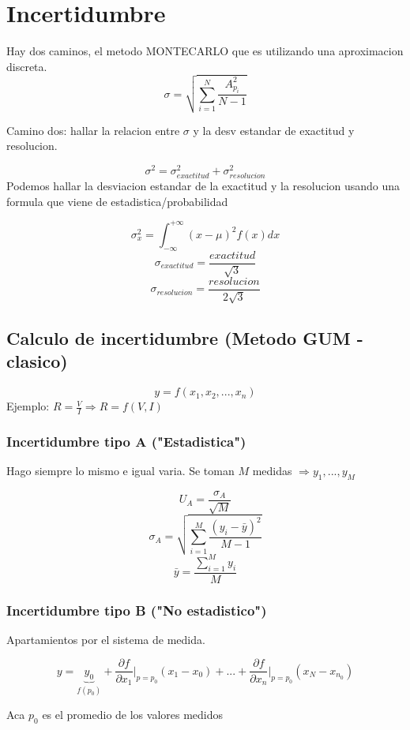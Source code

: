 \documentclass{report}
\begin{document}
\tableofcontents

\chapter{Incertidumbre}

Hay dos caminos, el metodo MONTECARLO que es utilizando una aproximacion discreta.
$$\sigma = \sqrt{\sum_{i=1}^{N} \frac{A_{p_i}^2}{N-1} }$$


Camino dos: hallar la relacion entre $\sigma$ y la desv estandar de exactitud y resolucion.

$$\sigma^2 = \sigma_{exactitud}^2 + \sigma_{resolucion}^2 $$
Podemos hallar la desviacion estandar de la exactitud y la resolucion usando una formula que viene de estadistica/probabilidad

$$\sigma_x^2 = \int_{-\infty}^{+\infty}{(x-\mu)^2f(x)dx}$$
$$\sigma_{exactitud} = \frac{exactitud}{\sqrt{3}}$$
$$\sigma_{resolucion} = \frac{resolucion}{2\sqrt{3}}$$


\section{Calculo de incertidumbre (Metodo GUM - clasico)}


$$y = f(x_1,x_2,...,x_n)$$
Ejemplo: $R = \frac{V}{I} \Rightarrow R = f(V,I)$

\subsection{Incertidumbre tipo A ("Estadistica")}

Hago siempre lo mismo e igual varia.
Se toman $M$ medidas $\Rightarrow y_1,...,y_M$

$$U_A = \frac{\sigma_A}{\sqrt{M}}$$
$$\sigma_A = \sqrt{\sum_{i=1}^M{\frac{(y_i - \bar{y})^2}{M-1}}}$$
$$\bar{y} = \frac{\sum_{i=1}^M{y_i}}{M}$$


\subsection{Incertidumbre tipo B ("No estadistico")}

Apartamientos por el sistema de medida.

$$y = \underbrace{y_0}_{f(p_0)} + \frac{\partial{f}}{\partial x_1}
	\rvert_{p=p_0} (x_1 - x_0) + ... + \frac{\partial{f}}{\partial x_n}
	\rvert_{p=p_0} (x_N - x_{n_0})$$

Aca $p_0$ es el promedio de los valores medidos
\end{document}
